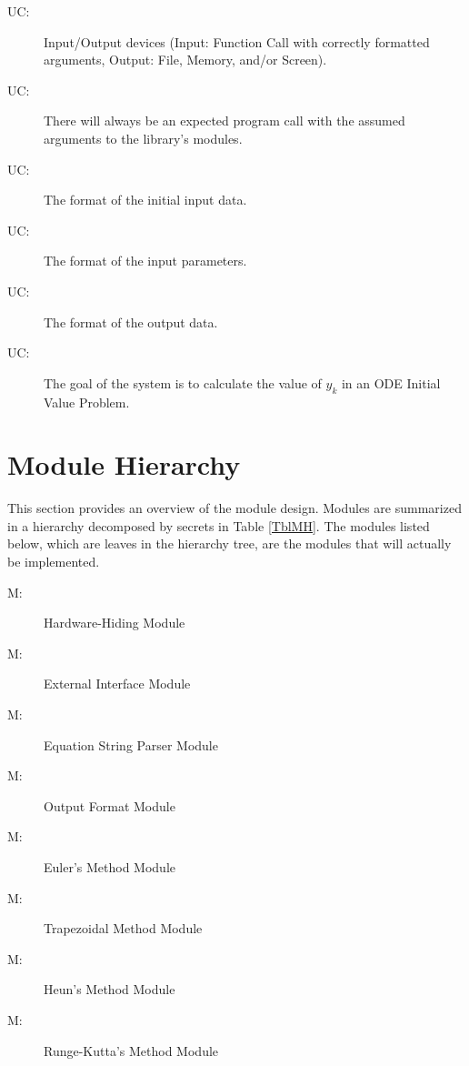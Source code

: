 \documentclass[12pt, titlepage]{article}
\newcounter{ucnum}
\newcommand{\uctheucnum}{UC\theucnum}
\newcounter{mnum}
\newcommand{\mthemnum}{M\themnum}
\begin{document}
\begin{description}
\item[ \uctheucnum \label{ucIO}:] Input/Output devices
  (Input: Function Call with correctly formatted arguments, Output: File, Memory, and/or Screen).
\item[ \uctheucnum \label{ucInput}:] There will always be
an expected program call with the assumed arguments to the library's modules.
\item[ \uctheucnum \label{ucInput}:] The format of the
  initial input data.
\item[ \uctheucnum \label{ucInputParams}:] The format
of the input parameters.
\item[ \uctheucnum \label{ucOutput}:] The format of the output data.
\item[ \uctheucnum \label{ucGoal}:] The goal of the system is to
calculate the value of $y_k$ in an ODE Initial Value Problem.
\end{description}


\section{Module Hierarchy} \label{SecMH}

This section provides an overview of the module design. Modules are summarized
in a hierarchy decomposed by secrets in Table \ref{TblMH}. The modules listed
below, which are leaves in the hierarchy tree, are the modules that will
actually be implemented.

\begin{description}
\item [ \mthemnum \label{mHH}:] Hardware-Hiding Module
\item [ \mthemnum \label{mExt}:] External Interface Module
\item [ \mthemnum \label{mODEParse}:] Equation String Parser Module
\item [ \mthemnum \label{mOutputFormat}:] Output Format Module
\item [ \mthemnum \label{mEuler}:] Euler's Method Module
\item [ \mthemnum \label{mTrap}:] Trapezoidal Method Module
\item [ \mthemnum \label{mHeun}:] Heun's Method Module
\item [ \mthemnum \label{mRK}:] Runge-Kutta's Method Module

\end{description}
\end{document}
